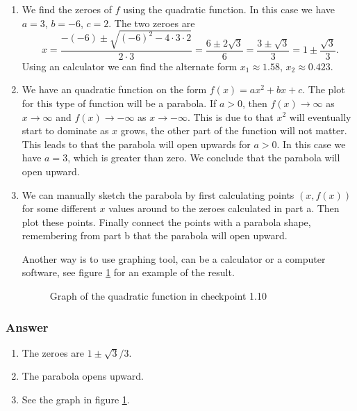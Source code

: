 \begin{enumerate}[label = (\alph*)]
  \item
    We find the zeroes of $ f $ using the quadratic function. In this case we have $ a = 3 $, $ b = -6 $, $ c = 2 $. The two zeroes are
    $$ \phantom{.}
    x = \frac{-(-6) \pm \sqrt{(-6)^2 - 4 \cdot 3 \cdot 2}}{2 \cdot 3} = \frac{6 \pm 2\sqrt{3}}{6} = \frac{3 \pm \sqrt{3}}{3} = 1 \pm \frac{\sqrt{3}}{3}
    .$$
    Using an calculator we can find the alternate form $ x_1 \approx 1.58 $, $ x_2 \approx 0.423 $.
  \item
    We have an quadratic function on the form $ f(x) = ax^2 + bx + c $. The plot for this type of function will be a parabola. If $ a > 0 $, then $ f(x) \to \infty $ as $ x \to \infty $ and $ f(x) \to -\infty $ as $ x \to -\infty $. This is due to that $ x^2 $ will eventually start to dominate as $ x $ grows, the other part of the function will not matter. This leads to that the parabola will open upwards for $ a > 0 $. In this case we have $ a = 3 $, which is greater than zero. We conclude that the parabola will open upward.
  \item
    We can manually sketch the parabola by first calculating points $ (x, f(x)) $ for some different $ x $ values around to the zeroes calculated in part a. Then plot these points. Finally connect the points with a parabola shape, remembering from part b that the parabola will open upward.

    Another way is to use graphing tool, can be a calculator or a computer software, see figure \ref{figure:checkpoint-1.10} for an example of the result.

    \begin{figure}[H]
      \centering
      \caption{Graph of the quadratic function in checkpoint 1.10}
      \label{figure:checkpoint-1.10}
    \end{figure}
\end{enumerate}

\subsubsection{Answer}

\begin{enumerate}[label = (\alph*)]
  \item
    The zeroes are $ 1 \pm {\sqrt{3}}/3 $.
  \item
    The parabola opens upward.
  \item
    See the graph in figure \ref{figure:checkpoint-1.10}.
\end{enumerate}
